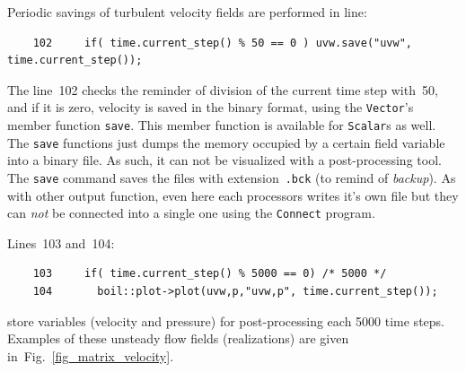 Periodic savings of turbulent velocity fields are performed in line:
%
{\small \begin{verbatim}
    102     if( time.current_step() % 50 == 0 ) uvw.save("uvw", time.current_step());
\end{verbatim}}
%
The line~102 checks the reminder of division of the current time step
with~50, and if it is zero, velocity is saved in the binary
format, using the {\tt Vector}'s member function {\tt save}. This
member function is available for {\tt Scalar}s as well. The {\tt save}
functions just dumps the memory occupied by a certain field variable
into a binary file. As such, it can not be visualized with a post-processing
tool. The {\tt save} command saves the files with extension~{\tt .bck} 
(to remind of {\em backup}).
As with other {\psiboil} output function, even here each processors
writes it's own file but they can {\em not} be connected into a single
one using the {\tt Connect} program.

Lines~103 and~104:
%
{\small \begin{verbatim}
    103     if( time.current_step() % 5000 == 0) /* 5000 */
    104       boil::plot->plot(uvw,p,"uvw,p", time.current_step());
\end{verbatim}}
%
store variables (velocity and pressure) for post-processing each
5000 time steps. Examples of these unsteady flow fields (realizations)
are given in~Fig.~\ref{fig_matrix_velocity}.

